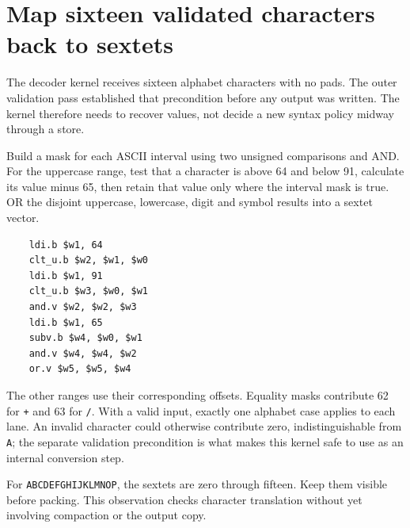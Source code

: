 \section{Map sixteen validated characters back to sextets}
The decoder kernel receives sixteen alphabet characters with no pads. The outer
validation pass established that precondition before any output was written. The kernel
therefore needs to recover values, not decide a new syntax policy midway through a store.

Build a mask for each ASCII interval using two unsigned comparisons and AND. For the
uppercase range, test that a character is above 64 and below 91, calculate its value
minus 65, then retain that value only where the interval mask is true. OR the disjoint
uppercase, lowercase, digit and symbol results into a sextet vector.

\begin{verbatim}
    ldi.b $w1, 64
    clt_u.b $w2, $w1, $w0
    ldi.b $w1, 91
    clt_u.b $w3, $w0, $w1
    and.v $w2, $w2, $w3
    ldi.b $w1, 65
    subv.b $w4, $w0, $w1
    and.v $w4, $w4, $w2
    or.v $w5, $w5, $w4
\end{verbatim}

The other ranges use their corresponding offsets. Equality masks contribute 62 for
\texttt{+} and 63 for \texttt{/}. With a valid input, exactly one alphabet case applies
to each lane. An invalid character could otherwise contribute zero, indistinguishable
from \texttt{A}; the separate validation precondition is what makes this kernel safe
to use as an internal conversion step.

For \texttt{ABCDEFGHIJKLMNOP}, the sextets are zero through fifteen. Keep them visible
before packing. This observation checks character translation without yet involving
compaction or the output copy.
